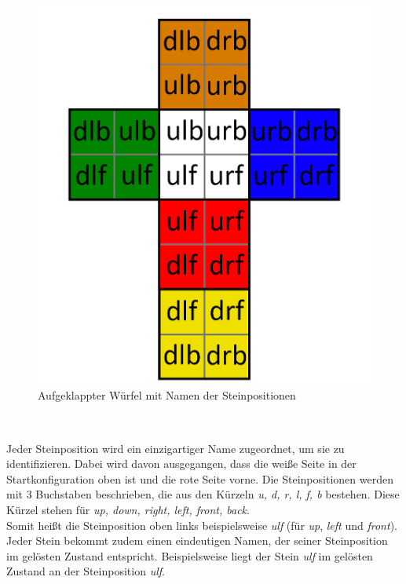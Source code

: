 \documentclass[12pt,a4paper, usenames, dvipsnames]{article}
\theoremstyle{mystyle}
\theoremstyle{definition}
\begin{document}
\begin{minipage}[b][][b]{0.43\textwidth}
\begin{figure}[H]
\centering
\includegraphics[scale=0.15]{foldedout_cage.png}
\caption[Aufgeklappter Würfel mit Namen der Steinpositionen]{Aufgeklappter Würfel mit Namen der Steinpositionen}
\label{Abbildung_SteinpositionNamenFoldetOut}
\end{figure}

\end{minipage}\begin{minipage}[b][][b]{0.04\textwidth}$\ $ \end{minipage}


Jeder Steinposition wird ein einzigartiger Name zugeordnet, um sie zu identifizieren. Dabei wird davon ausgegangen, dass die weiße Seite in der Startkonfiguration oben ist und die rote Seite vorne. Die Steinpositionen werden mit 3 Buchstaben beschrieben, die aus den Kürzeln \textit{u, d, r, l, f, b} bestehen. Diese Kürzel stehen für \textit{up, down, right, left, front, back}. \\
Somit heißt die Steinposition oben links beispielsweise \textit{ulf} (für \textit{up}, \textit{left} und \textit{front}). 
Jeder Stein bekommt zudem einen eindeutigen Namen, der seiner Steinposition im gelösten Zustand entspricht. Beispielsweise liegt der Stein \textit{ulf} im gelösten Zustand an der Steinposition \textit{ulf}.
\end{document}
